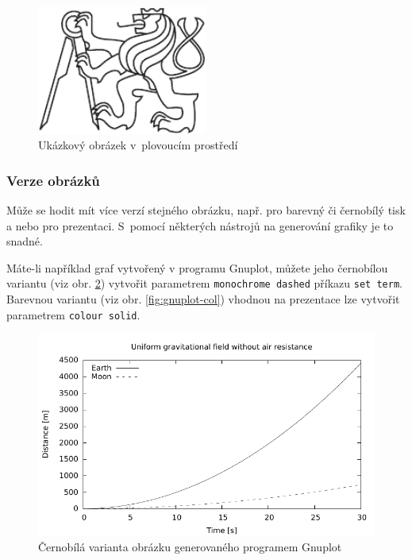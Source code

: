 \documentclass[thesis=B,czech]{FITthesis}[2011/06/14]
\begin{document}
 \begin{figure}[h]\centering
 	\includegraphics[width=0.5\textwidth, angle=30]{cvut-logo-bw}
 	\caption[Příklad obrázku]{Ukázkový obrázek v~plovoucím prostředí}\label{fig:float}
 \end{figure}
 
 \subsubsection{Verze obrázků}
 
 Může se hodit mít více verzí stejného obrázku, např. pro barevný či černobílý tisk a nebo pro prezentaci. S~pomocí některých nástrojů na generování grafiky je to snadné.
 
 Máte-li například graf vytvořený v programu Gnuplot, můžete jeho černobílou variantu (viz obr. \ref{fig:gnuplot-bw}) vytvořit parametrem \verb|monochrome dashed| příkazu \verb|set term|. Barevnou variantu (viz obr. \ref{fig:gnuplot-col}) vhodnou na prezentace lze vytvořit parametrem \verb|colour solid|.
 
 \begin{figure}\centering
 	\includegraphics{gnuplot-bw}
 	\caption{Černobílá varianta obrázku generovaného programem Gnuplot}\label{fig:gnuplot-bw}
 \end{figure}
 
\end{document}
